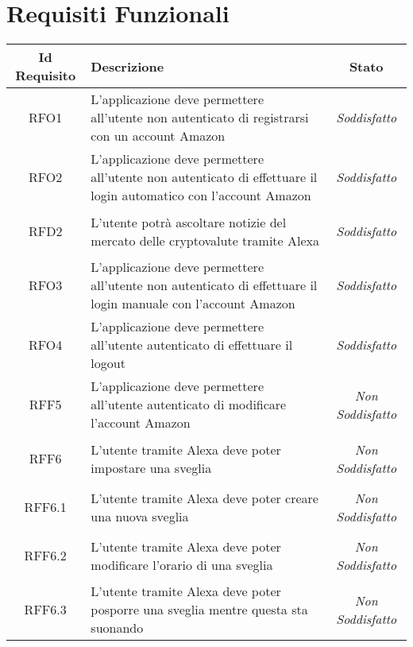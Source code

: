 \section{Requisiti Funzionali}
\normalsize
\begin{longtable}{|c|>{\centering}m{7cm}|c|}
	\hline
	\textbf{Id Requisito} & \textbf{Descrizione} & \textbf{Stato}\\
	\hline
	\endhead
	\hypertarget{RFO1}{RFO1} & L'applicazione deve permettere all'utente non autenticato di registrarsi con un account Amazon & \textit{Soddisfatto}\\ \hline
	
	\hypertarget{RFO2}{RFO2} & L'applicazione deve permettere all'utente non autenticato di effettuare il login automatico con l'account Amazon & \textit{Soddisfatto}\\ \hline
	
	\hypertarget{RFD2}{RFD2} & L'utente potrà ascoltare notizie del mercato delle cryptovalute tramite Alexa & \textit{Soddisfatto}\\ \hline
	
	\hypertarget{RFO3}{RFO3} & L'applicazione deve permettere all'utente non autenticato di effettuare il login manuale con l'account Amazon & \textit{Soddisfatto}\\ \hline
	
	\hypertarget{RFO4}{RFO4} & L'applicazione deve permettere all'utente autenticato di effettuare il logout & \textit{Soddisfatto}\\ \hline
	
	\hypertarget{RFF5}{RFF5} & L'applicazione deve permettere all'utente autenticato di modificare l'account Amazon & \textit{Non Soddisfatto}\\ \hline
	
	\hypertarget{RFF6}{RFF6} & L'utente tramite Alexa deve poter impostare una sveglia & \textit{Non Soddisfatto}\\ \hline
	
	\hypertarget{RFF6.1}{RFF6.1} & L'utente tramite Alexa deve poter creare una nuova sveglia & \textit{Non Soddisfatto}\\ \hline
	
	\hypertarget{RFF6.2}{RFF6.2} & L'utente tramite Alexa deve poter modificare l'orario di una sveglia & \textit{Non Soddisfatto}\\ \hline
	
	\hypertarget{RFF6.3}{RFF6.3} & L'utente tramite Alexa deve poter posporre una sveglia mentre questa sta suonando & \textit{Non Soddisfatto}\\ \hline
	

\end{longtable}
